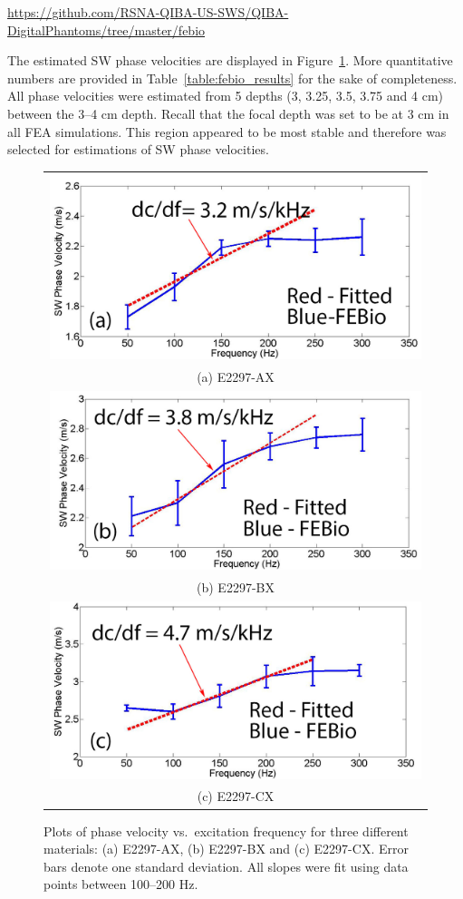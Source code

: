 \url{https://github.com/RSNA-QIBA-US-SWS/QIBA-DigitalPhantoms/tree/master/febio}

The estimated SW phase velocities are displayed in
Figure~\ref{fig:febio_results}. More quantitative numbers are provided in
Table~\ref{table:febio_results} for the sake of completeness. All phase
velocities were estimated from 5 depths (3, 3.25, 3.5, 3.75 and 4 cm) between
the 3--4 cm depth. Recall that the focal depth was set to be at 3 cm in all FEA
simulations. This region appeared to be most stable and therefore was selected
for estimations of SW phase velocities.

\begin{figure}[htb!]
    \centering
    \begin{tabular}{c}
    \includegraphics[width=0.5\linewidth]{figs/result1.jpg} \\
    (a) E2297-AX\\
    \includegraphics[width=0.5\linewidth]{figs/result2.jpg} \\
    (b) E2297-BX\\
    \includegraphics[width=0.5\linewidth]{figs/result3.jpg} \\
    (c) E2297-CX\\
    \end{tabular}
    \caption{Plots of phase velocity vs.\ excitation frequency for three
    different materials: (a) E2297-AX, (b) E2297-BX and (c) E2297-CX\@. Error
    bars denote one standard deviation. All slopes were fit using data points
    between 100--200 Hz.}
\label{fig:febio_results}
\end{figure}

